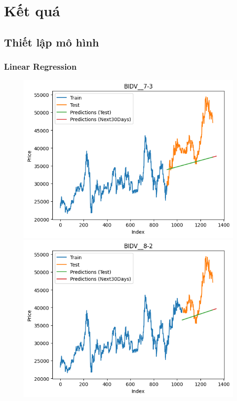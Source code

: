 \section{Kết quá}

\subsection{Thiết lập mô hình} 
\subsubsection{Linear Regression}
\begin{figure}[H]
    \centering
    \begin{minipage}{0.15\textwidth}
    \centering
    \includegraphics[width=1\textwidth]{resources/chapter-5/newdata/result/BIDV_LinearRegression_7-3.png}
    \end{minipage}
    \hfill
    \begin{minipage}{0.15\textwidth}
    \centering
    \includegraphics[width=1\textwidth]{resources/chapter-5/newdata/result/BIDV_LinearRegression_8-2.png}

\end{minipage}
\end{figure}
